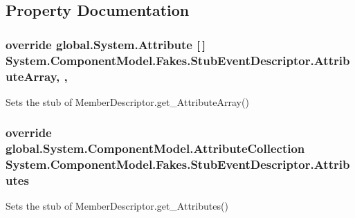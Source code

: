 \subsection{Property Documentation}
\hypertarget{class_system_1_1_component_model_1_1_fakes_1_1_stub_event_descriptor_a0989f7d1e62728f3ae9d43c8a8d0a7fb}{
\subsubsection[{Attribute\-Array}]{\setlength{\rightskip}{0pt plus 5cm}override global.\-System.\-Attribute \mbox{[}$\,$\mbox{]} System.\-Component\-Model.\-Fakes.\-Stub\-Event\-Descriptor.\-Attribute\-Array\hspace{0.3cm}{\ttfamily [get]}, {\ttfamily [set]}, {\ttfamily [protected]}}}\label{class_system_1_1_component_model_1_1_fakes_1_1_stub_event_descriptor_a0989f7d1e62728f3ae9d43c8a8d0a7fb}


Sets the stub of Member\-Descriptor.\-get\-\_\-\-Attribute\-Array()

\hypertarget{class_system_1_1_component_model_1_1_fakes_1_1_stub_event_descriptor_a2137e0fe705ebcf958cc21286d9eb748}{
\subsubsection[{Attributes}]{\setlength{\rightskip}{0pt plus 5cm}override global.\-System.\-Component\-Model.\-Attribute\-Collection System.\-Component\-Model.\-Fakes.\-Stub\-Event\-Descriptor.\-Attributes\hspace{0.3cm}{\ttfamily [get]}}}\label{class_system_1_1_component_model_1_1_fakes_1_1_stub_event_descriptor_a2137e0fe705ebcf958cc21286d9eb748}


Sets the stub of Member\-Descriptor.\-get\-\_\-\-Attributes()

